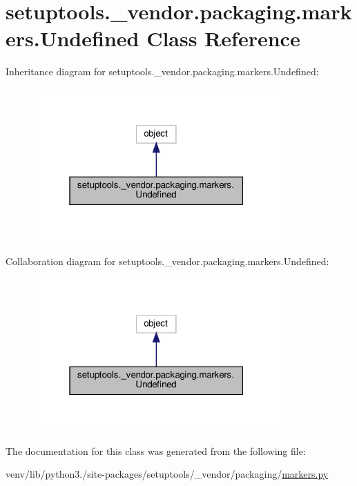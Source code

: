 \hypertarget{classsetuptools_1_1__vendor_1_1packaging_1_1markers_1_1Undefined}{}\section{setuptools.\+\_\+vendor.\+packaging.\+markers.\+Undefined Class Reference}
\label{classsetuptools_1_1__vendor_1_1packaging_1_1markers_1_1Undefined}


Inheritance diagram for setuptools.\+\_\+vendor.\+packaging.\+markers.\+Undefined\+:
\nopagebreak
\begin{figure}[H]
\begin{center}
\leavevmode
\includegraphics[width=268pt]{classsetuptools_1_1__vendor_1_1packaging_1_1markers_1_1Undefined__inherit__graph}
\end{center}
\end{figure}


Collaboration diagram for setuptools.\+\_\+vendor.\+packaging.\+markers.\+Undefined\+:
\nopagebreak
\begin{figure}[H]
\begin{center}
\leavevmode
\includegraphics[width=268pt]{classsetuptools_1_1__vendor_1_1packaging_1_1markers_1_1Undefined__coll__graph}
\end{center}
\end{figure}


The documentation for this class was generated from the following file\+:\begin{DoxyCompactItemize}
\item 
venv/lib/python3./site-\/packages/setuptools/\+\_\+vendor/packaging/\hyperlink{setuptools_2__vendor_2packaging_2markers_8py}{markers.\+py}\end{DoxyCompactItemize}
